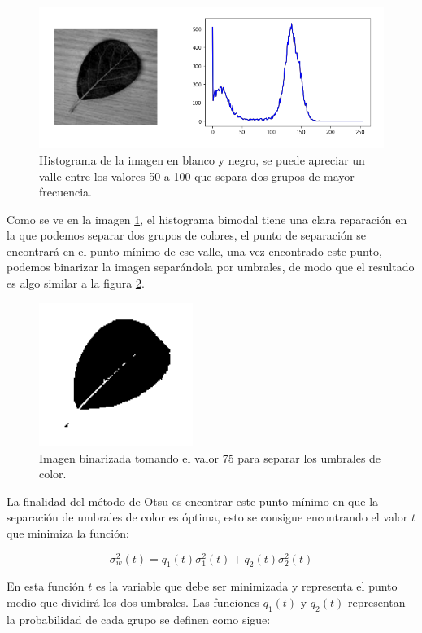 \documentclass[letter]{article}
\begin{document}
\begin{figure}[htbp]
\centering
\includegraphics[width=.9\linewidth]{./images/histogram2.png}
\caption{\label{fig:org3925312}Histograma de la imagen en blanco y negro, se puede apreciar un valle entre los valores 50 a 100 que separa dos grupos de mayor frecuencia.}
\end{figure}

Como se ve en la imagen \ref{fig:org3925312}, el histograma bimodal tiene una clara
reparación en la que podemos separar dos grupos de colores, el punto de
separación se encontrará en el punto mínimo de ese valle, una vez encontrado
este punto, podemos binarizar \cite{Noh2005} la imagen separándola por umbrales, de modo que el
resultado es algo similar a la figura \ref{fig:org0a7b6e1}.

\begin{figure}[htbp]
\centering
\includegraphics[width=5cm]{./images/binaryleaf.png}
\caption{\label{fig:org0a7b6e1}Imagen binarizada tomando el valor 75 para separar los umbrales de color.}
\end{figure}

La finalidad del método de Otsu es encontrar este punto mínimo en que la
separación de umbrales de color es óptima, esto se consigue encontrando el valor
\(t\) que minimiza la función:

\begin{equation}
\label{eq:org0127728}
\sigma_w^2(t) =  q_1(t)\sigma_1^2(t) + q_2(t)\sigma_2^2(t)
\end{equation}

En esta función \(t\) es la variable que debe ser minimizada y representa el punto
medio que dividirá los dos umbrales. Las funciones \(q_1(t)\) y \(q_2(t)\)
representan la probabilidad de cada grupo se definen como sigue:
\end{document}
